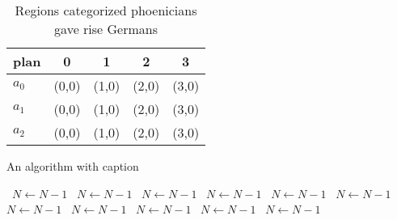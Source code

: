 \documentclass[a4paper]{article}
\begin{document}
\begin{table}
\begin{adjustbox}{width=0.6\columnwidth}
\begin{tabular}{|l|l|l|l|l|}
\hline
\textbf{plan} & \multicolumn{1}{c|}{\textbf{0}} & \multicolumn{1}{c|}{\textbf{1}} & \multicolumn{1}{c|}{\textbf{2}} & \multicolumn{1}{c|}{\textbf{3}} \\ \hline
\textbf{$a_0$}  & (0,0) & (1,0) & (2,0) & (3,0) \\ \hline
\textbf{$a_1$}  & (0,0) & (1,0) & (2,0) & (3,0) \\ \hline
\textbf{$a_2$}  & (0,0) & (1,0) & (2,0) & (3,0) \\ \hline
\end{tabular}
\end{adjustbox}
\caption{Regions categorized phoenicians gave rise Germans
}
\end{table}

\begin{algorithm}
\caption{An algorithm with caption}
\begin{algorithmic}
\    \State $N \gets N - 1$
\    \State $N \gets N - 1$
\    \State $N \gets N - 1$
\    \State $N \gets N - 1$
\    \State $N \gets N - 1$
\    \State $N \gets N - 1$
\    \State $N \gets N - 1$
\    \State $N \gets N - 1$
\    \State $N \gets N - 1$
\    \State $N \gets N - 1$
\    \State $N \gets N - 1$
\EndWhile
\end{algorithmic}
\end{algorithm}
\end{document}
